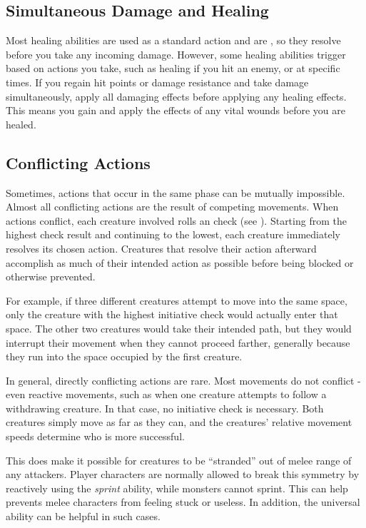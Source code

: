         \subsection{Simultaneous Damage and Healing}\label{Simultaneous Damage and Healing}
            Most healing abilities are used as a standard action and are , so they resolve before you take any incoming damage.
            However, some healing abilities trigger based on actions you take, such as healing if you hit an enemy, or at specific times.
            If you regain hit points or damage resistance and take damage simultaneously, apply all damaging effects before applying any healing effects.
            This means you gain and apply the effects of any vital wounds before you are healed.

    \subsection{Conflicting Actions}\label{Conflicting Actions}
        Sometimes, actions that occur in the same phase can be mutually impossible.
        Almost all conflicting actions are the result of competing movements.
        When actions conflict, each creature involved rolls an  check (see ).
        Starting from the highest check result and continuing to the lowest, each creature immediately resolves its chosen action.
        Creatures that resolve their action afterward accomplish as much of their intended action as possible before being blocked or otherwise prevented.

        For example, if three different creatures attempt to move into the same space, only the creature with the highest initiative check would actually enter that space.
        The other two creatures would take their intended path, but they would interrupt their movement when they cannot proceed farther, generally because they run into the space occupied by the first creature.

        In general, directly conflicting actions are rare.
        Most movements do not conflict - even reactive movements, such as when one creature attempts to follow a withdrawing creature.
        In that case, no initiative check is necessary.
        Both creatures simply move as far as they can, and the creatures' relative movement speeds determine who is more successful.

        This does make it possible for creatures to be ``stranded'' out of melee range of any attackers.
        Player characters are normally allowed to break this symmetry by reactively using the \textit{sprint} ability, while monsters cannot sprint.
        This can help prevents melee characters from feeling stuck or useless.
        In addition, the  universal ability can be helpful in such cases.

